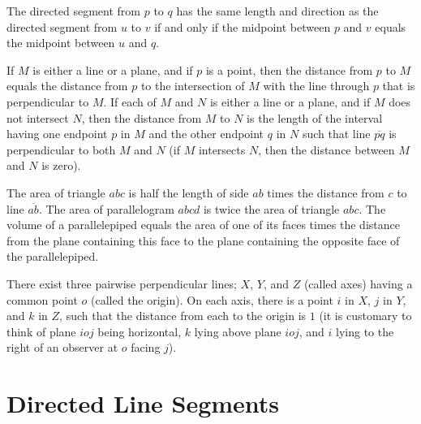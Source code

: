 \documentclass{article}
\begin{document}
The directed segment from $p$ to $q$ has the same length and direction as the directed segment from $u$ to $v$ if and only if the midpoint between $p$ and $v$ equals the midpoint between $u$ and $q$.

If $M$ is either a line or a plane, and if $p$ is a point, then the distance from $p$ to $M$ equals the distance from $p$ to the intersection of $M$ with the line through $p$ that is perpendicular to $M$. If each of $M$ and $N$ is either a line or a plane, and if $M$ does not intersect $N$, then the distance from $M$ to $N$ is the length of the interval having one endpoint $p$ in $M$ and the other endpoint $q$ in $N$ such that line $\overline{p q}$ is perpendicular to both $M$ and $N$ (if $M$ intersects $N$, then the distance between $M$ and $N$ is zero).

The area of triangle $a b c$ is half the length of side $a b$ times the distance from $c$ to line $\overline{a b}$. The area of parallelogram $a b c d$ is twice the area of triangle $a b c$. The volume of a parallelepiped equals the area of one of its faces times the distance from the plane containing this face to the plane containing the opposite face of the parallelepiped.

There exist three pairwise perpendicular lines; $X$, $Y$, and $Z$ (called axes) having a common point $o$ (called the origin). On each axis, there is a point $i$ in $X$, $j$ in $Y$, and $k$ in $Z$, such that the distance from each to the origin is $1$ (it is customary to think of plane $i o j$ being horizontal, $k$ lying above plane $i o j$, and $i$ lying to the right of an observer at $o$ facing $j$).


\section{Directed Line Segments}
\end{document}
